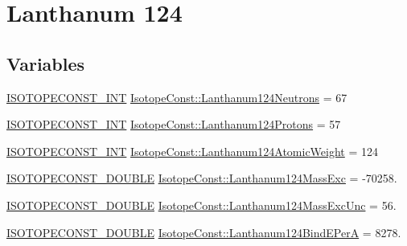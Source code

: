 \hypertarget{group___isotope_const-_lanthanum-_la124}{}\section{Lanthanum 124}
\label{group___isotope_const-_lanthanum-_la124}
\subsection*{Variables}
\begin{DoxyCompactItemize}
\item 
\mbox{\hyperlink{group___isotope_const-_macros_ga5f18360b3e99483a35c32d789e62621c}{I\+S\+O\+T\+O\+P\+E\+C\+O\+N\+S\+T\+\_\+\+I\+NT}} \mbox{\hyperlink{group___isotope_const-_lanthanum-_la124_ga6c10cba53639fa7f0399c7d0ad7390d8}{Isotope\+Const\+::\+Lanthanum124\+Neutrons}} = 67
\item 
\mbox{\hyperlink{group___isotope_const-_macros_ga5f18360b3e99483a35c32d789e62621c}{I\+S\+O\+T\+O\+P\+E\+C\+O\+N\+S\+T\+\_\+\+I\+NT}} \mbox{\hyperlink{group___isotope_const-_lanthanum-_la124_gaa5ef6f6bc5d32cdf735ebc513ca43193}{Isotope\+Const\+::\+Lanthanum124\+Protons}} = 57
\item 
\mbox{\hyperlink{group___isotope_const-_macros_ga5f18360b3e99483a35c32d789e62621c}{I\+S\+O\+T\+O\+P\+E\+C\+O\+N\+S\+T\+\_\+\+I\+NT}} \mbox{\hyperlink{group___isotope_const-_lanthanum-_la124_ga319afb545064363e6221c207bec421f8}{Isotope\+Const\+::\+Lanthanum124\+Atomic\+Weight}} = 124
\item 
\mbox{\hyperlink{group___isotope_const-_macros_ga8f45a7272ce02c0b4c65c44636ed719a}{I\+S\+O\+T\+O\+P\+E\+C\+O\+N\+S\+T\+\_\+\+D\+O\+U\+B\+LE}} \mbox{\hyperlink{group___isotope_const-_lanthanum-_la124_ga5eeccaaa5841c6e09c3186df62642c3d}{Isotope\+Const\+::\+Lanthanum124\+Mass\+Exc}} = -\/70258.
\item 
\mbox{\hyperlink{group___isotope_const-_macros_ga8f45a7272ce02c0b4c65c44636ed719a}{I\+S\+O\+T\+O\+P\+E\+C\+O\+N\+S\+T\+\_\+\+D\+O\+U\+B\+LE}} \mbox{\hyperlink{group___isotope_const-_lanthanum-_la124_ga35300c3b21cfdf749e0fa19719609f02}{Isotope\+Const\+::\+Lanthanum124\+Mass\+Exc\+Unc}} = 56.
\item 
\mbox{\hyperlink{group___isotope_const-_macros_ga8f45a7272ce02c0b4c65c44636ed719a}{I\+S\+O\+T\+O\+P\+E\+C\+O\+N\+S\+T\+\_\+\+D\+O\+U\+B\+LE}} \mbox{\hyperlink{group___isotope_const-_lanthanum-_la124_ga4788768579717388d2c74f72f6fa1566}{Isotope\+Const\+::\+Lanthanum124\+Bind\+E\+PerA}} = 8278.
\item 

\end{DoxyCompactItemize}

